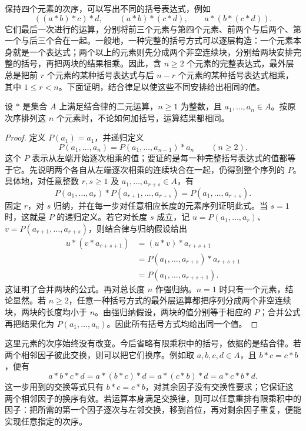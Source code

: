 \ProseParagraphBreak
保持四个元素的次序，可以写出不同的括号表达式，例如
\[
	((a*b)*c)*d,\qquad (a*b)*(c*d),\qquad a*(b*(c*d)).
\]
它们最后一次进行的运算，分别将前三个元素与第四个元素、前两个与后两个、第一个与后三个合在一起。一般地，一种完整的括号方式可以逐层构造：一个元素本身就是一个表达式；两个以上的元素则先分成两个非空连续块，分别给两块安排完整的括号，再把两块的结果相乘。因此，含 \(n\geq2\) 个元素的完整表达式，最外层总是把前 \(r\) 个元素的某种括号表达式与后 \(n-r\) 个元素的某种括号表达式相乘，其中 \(1\leq r<n\)。下面证明，结合律足以使这些不同安排给出相同的值。

\begin{proposition}[有限乘积的括号]\label{b1:prop:parentheses}
	设 \(*\) 是集合 \(A\) 上满足结合律的二元运算，\(n\geq1\) 为整数，且 \(a_1,\ldots,a_n\in A\)。按原次序排列这 \(n\) 个元素时，不论如何加括号，运算结果都相同。
\end{proposition}

\begin{proof}
	定义 \(P(a_1)=a_1\)，并递归定义
	\[
		P(a_1,\ldots,a_n)=P(a_1,\ldots,a_{n-1})*a_n\qquad(n\geq2).
	\]
	这个 \(P\) 表示从左端开始逐次相乘的值；要证的是每一种完整括号表达式的值都等于它。先说明两个各自从左端逐次相乘的连续块合在一起，仍得到整个序列的 \(P\)。具体地，对任意整数 \(r,s\geq1\) 及 \(a_1,\ldots,a_{r+s}\in A\)，有
	\[
		P(a_1,\ldots,a_r)*P(a_{r+1},\ldots,a_{r+s}) =P(a_1,\ldots,a_{r+s}).
	\]
	固定 \(r\)，对 \(s\) 归纳，并在每一步对任意相应长度的元素序列证明此式。当 \(s=1\) 时，这就是 \(P\) 的递归定义。若它对长度 \(s\) 成立，记 \(u=P(a_1,\ldots,a_r)\)、\(v=P(a_{r+1},\ldots,a_{r+s})\)，则结合律与归纳假设给出
	\[
		\begin{aligned}
			u*(v*a_{r+s+1})&=(u*v)*a_{r+s+1}\\
			&=P(a_1,\ldots,a_{r+s})*a_{r+s+1}\\
			&=P(a_1,\ldots,a_{r+s+1}).
		\end{aligned}
	\]
	这证明了合并两块的公式。再对总长度 \(n\) 作强归纳。\(n=1\) 时只有一个元素，结论显然。若 \(n\geq2\)，任意一种括号方式的最外层运算都把序列分成两个非空连续块，两块的长度均小于 \(n\)。由强归纳假设，两块的值分别等于相应的 \(P\)；合并公式再把结果化为 \(P(a_1,\ldots,a_n)\)。因此所有括号方式均给出同一个值。
\end{proof}

这里元素的次序始终没有改变。今后省略有限乘积中的括号，依据的是结合律。若两个相邻因子彼此交换，则可以把它们换序。例如取 \(a,b,c,d\in A\)，且 \(b*c=c*b\)，便有
\[
	a*b*c*d=a*(b*c)*d=a*(c*b)*d=a*c*b*d.
\]
这一步用到的交换等式只有 \(b*c=c*b\)，对其余因子没有交换性要求；它保证这两个相邻因子的换序有效。若运算本身满足交换律，则可以任意重排有限乘积中的因子：把所需的第一个因子逐次与左邻交换，移到首位，再对剩余因子重复，便能实现任意指定的次序。


